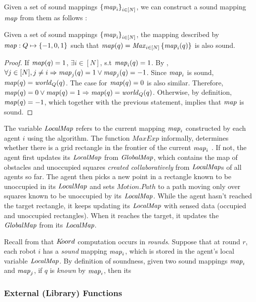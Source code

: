 Given a set of sound mappings $\left\{\mathit{map}_i\right\}_{i\in[N]}$, we can construct a sound mapping $\mathit{map}$ from them as follows :

\begin{lemma}
    Given a set of sound mappings $\left\{\mathit{map}_i\right\}_{i\in[N]}$, the mapping described by $\mathit{map}: Q \mapsto \left\{-1,0,1\right\}$ such that $\mathit{map}(q) = \mathit{Max}_{i\in[N]}\left\{\mathit{map}_i(q)\right\}$ is also sound.
\end{lemma}

\begin{proof}
    If $\mathit{map}(q) = 1$, $\exists i\in [N]$, s.t $\mathit{map}_i(q) = 1$. By , $\forall j \in [N], j\neq i \Rightarrow \mathit{map}_j(q) = 1\vee \mathit{map}_j(q) = -1$. Since $\mathit{map}_i$ is sound, $\mathit{map}(q) = \mathit{world}_Q(q)$. The case for $\mathit{map}(q) = 0$ is also similar. Therefore, $\mathit{map}(q) = 0\vee \mathit{map}(q) = 1\Rightarrow \mathit{map}(q) = \mathit{world}_Q(q)$. Otherwise, by definition, $\mathit{map}(q) = -1$, which together with the previous statement, implies that $\mathit{map}$ is sound.
\end{proof}

The variable $\mathit{LocalMap}$ refers to the current mapping $\mathit{map}_i$ constructed by each agent $i$ using the algorithm. The function $\mathit{MaxExp}$ informally, determines whether there is a grid rectangle in the frontier of the current $\mathit{map}_i$ . If not, the agent first updates its $\mathit{LocalMap}$ from $\mathit{GlobalMap}$, which contains the map of obstacles and unoccupied squares \emph{created collaboratively} from $\mathit{LocalMap}$s of all agents so far. The agent then picks a new point in a rectangle known to be unoccupied in its $\mathit{LocalMap}$ and sets $\mathit{Motion.Path}$ to a path moving only over squares known to be unoccupied by its $\mathit{LocalMap}$. While the agent hasn't reached the target rectangle, it keeps updating its $\mathit{LocalMap}$ with sensed data (occupied and unoccupied rectangles). When it reaches the target, it updates the $\mathit{GlobalMap}$ from its $\mathit{LocalMap}$.


 Recall from  that $K\kern-2pt oord$ computation occurs in \emph{rounds}. Suppose that at round $r$, each robot $i$ has a \emph{sound} mapping $\mathit{map}_i$, which is stored in the agent's local variable $\mathit{LocalMap}$.  By definition of soundness, given two sound mappings $\mathit{map}_i$ and $\mathit{map}_j$, if $q$ is \emph{known} by $\mathit{map}_i$, then its
\subsubsection{External (Library) Functions}

